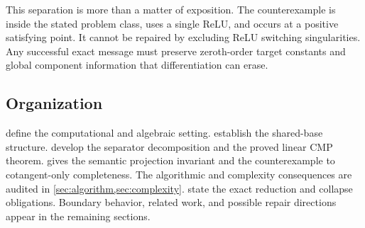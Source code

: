 This separation is more than a matter of exposition.  The counterexample is
inside the stated problem class, uses a single ReLU, and occurs at a positive
satisfying point.  It cannot be repaired by excluding ReLU switching
singularities.  Any successful exact message must preserve zeroth-order target
constants and global component information that differentiation can erase.

\subsection{Organization}

 define the computational and
algebraic setting.  
establish the shared-base structure.   develop the
separator decomposition and the proved linear CMP theorem.
 gives the semantic projection invariant and the
counterexample to cotangent-only completeness.  The algorithmic and complexity
consequences are audited in \cref{sec:algorithm,sec:complexity}.
 state the exact reduction and collapse
obligations.  Boundary behavior, related work, and possible repair directions
appear in the remaining sections.
